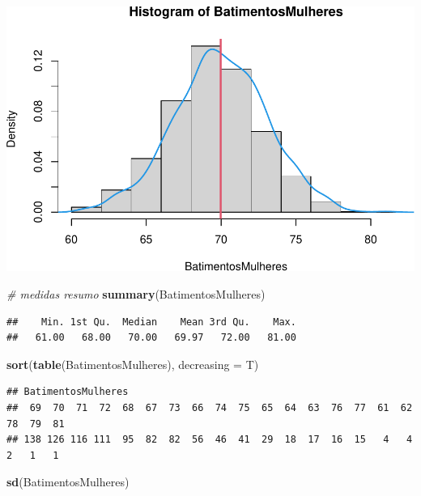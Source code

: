 \documentclass[
]{book}
\newenvironment{Shaded}{\begin{snugshade}}{\end{snugshade}}
\newcommand{\AttributeTok}[1]{\textcolor[rgb]{0.13,0.29,0.53}{#1}}
\newcommand{\CommentTok}[1]{\textcolor[rgb]{0.56,0.35,0.01}{\textit{#1}}}
\newcommand{\FunctionTok}[1]{\textcolor[rgb]{0.13,0.29,0.53}{\textbf{#1}}}
\newcommand{\NormalTok}[1]{#1}
\begin{document}
\includegraphics{Livro-Estatistica+R_files/figure-latex/unnamed-chunk-23-2.pdf}

\begin{Shaded}
\begin{Highlighting}[]
\CommentTok{\# medidas resumo}
\FunctionTok{summary}\NormalTok{(BatimentosMulheres)}
\end{Highlighting}
\end{Shaded}

\begin{verbatim}
##    Min. 1st Qu.  Median    Mean 3rd Qu.    Max. 
##   61.00   68.00   70.00   69.97   72.00   81.00
\end{verbatim}

\begin{Shaded}
\begin{Highlighting}[]
\FunctionTok{sort}\NormalTok{(}\FunctionTok{table}\NormalTok{(BatimentosMulheres), }\AttributeTok{decreasing =}\NormalTok{ T)}
\end{Highlighting}
\end{Shaded}

\begin{verbatim}
## BatimentosMulheres
##  69  70  71  72  68  67  73  66  74  75  65  64  63  76  77  61  62  78  79  81 
## 138 126 116 111  95  82  82  56  46  41  29  18  17  16  15   4   4   2   1   1
\end{verbatim}

\begin{Shaded}
\begin{Highlighting}[]
\FunctionTok{sd}\NormalTok{(BatimentosMulheres)}
\end{Highlighting}
\end{Shaded}
\end{document}
